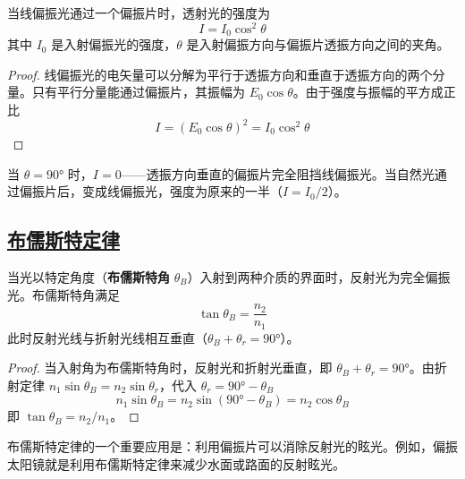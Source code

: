 \begin{theorem}[马吕斯定律]
    当线偏振光通过一个偏振片时，透射光的强度为
    \begin{equation}
        I = I_0\cos^2\theta
    \end{equation}
    其中 $I_0$ 是入射偏振光的强度，$\theta$ 是入射偏振方向与偏振片透振方向之间的夹角。
\end{theorem}

\begin{proof}
    线偏振光的电矢量可以分解为平行于透振方向和垂直于透振方向的两个分量。只有平行分量能通过偏振片，其振幅为 $E_0\cos\theta$。由于强度与振幅的平方成正比
    \begin{equation}
        I = (E_0\cos\theta)^2 = I_0\cos^2\theta
    \end{equation}
\end{proof}

\begin{remark}
    当 $\theta = 90°$ 时，$I = 0$——透振方向垂直的偏振片完全阻挡线偏振光。当自然光通过偏振片后，变成线偏振光，强度为原来的一半（$I = I_0/2$）。
\end{remark}

\subsection{\protect\hyperlink{:}{布儒斯特定律}}

\begin{theorem}[布儒斯特定律]
    当光以特定角度（\textbf{布儒斯特角} $\theta_B$）入射到两种介质的界面时，反射光为完全偏振光。布儒斯特角满足
    \begin{equation}
        \tan\theta_B = \frac{n_2}{n_1}
    \end{equation}
    此时反射光线与折射光线相互垂直（$\theta_B + \theta_r = 90°$）。
\end{theorem}

\begin{proof}
    当入射角为布儒斯特角时，反射光和折射光垂直，即 $\theta_B + \theta_r = 90°$。由折射定律 $n_1\sin\theta_B = n_2\sin\theta_r$，代入 $\theta_r = 90° - \theta_B$
    \begin{equation}
        n_1\sin\theta_B = n_2\sin(90° - \theta_B) = n_2\cos\theta_B
    \end{equation}
    即 $\tan\theta_B = n_2/n_1$。
\end{proof}

\begin{remark}
    布儒斯特定律的一个重要应用是：利用偏振片可以消除反射光的眩光。例如，偏振太阳镜就是利用布儒斯特定律来减少水面或路面的反射眩光。
\end{remark}

